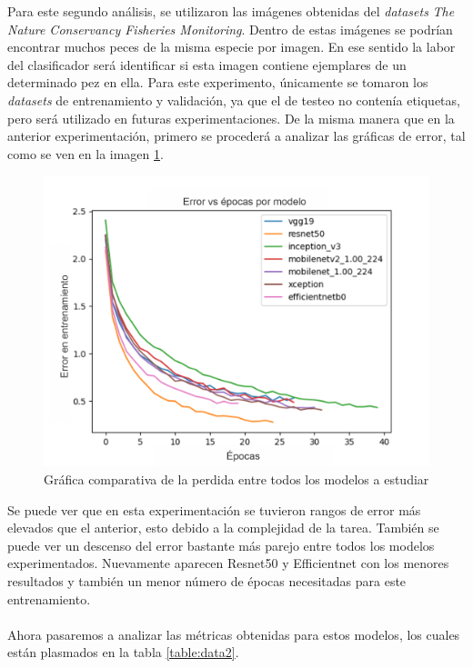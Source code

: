 Para este segundo análisis, se  utilizaron las imágenes obtenidas del  \textit{datasets} \textit{The Nature Conservancy Fisheries Monitoring}. Dentro de estas imágenes se podrían encontrar muchos peces de la misma especie por imagen. En ese sentido la labor del clasificador será identificar si esta imagen contiene ejemplares de un determinado pez en ella. Para este experimento, únicamente se tomaron los \textit{datasets} de entrenamiento y validación, ya que el de testeo no contenía etiquetas, pero será utilizado en futuras experimentaciones.  De la misma manera que en la anterior experimentación, primero se procederá a analizar las gráficas de error, tal como se ven en la imagen \ref{fig:losses2}.
\begin{figure}[h!]
\includegraphics[width=1\textwidth]{images/loss2.png}
\centering
\caption{Gráfica comparativa de la perdida entre todos los modelos a estudiar}
\label{fig:losses2}
\end{figure}
Se puede ver que en esta experimentación se tuvieron rangos de error más elevados que el anterior, esto debido a la complejidad de la tarea. También se puede ver un descenso del error bastante más parejo entre todos los modelos experimentados. Nuevamente aparecen Resnet50 y Efficientnet con los menores resultados y también un menor número de épocas necesitadas para este entrenamiento.\\\\
Ahora pasaremos a analizar las métricas obtenidas para estos modelos, los cuales están plasmados en la tabla \ref{table:data2}.
\newpage
